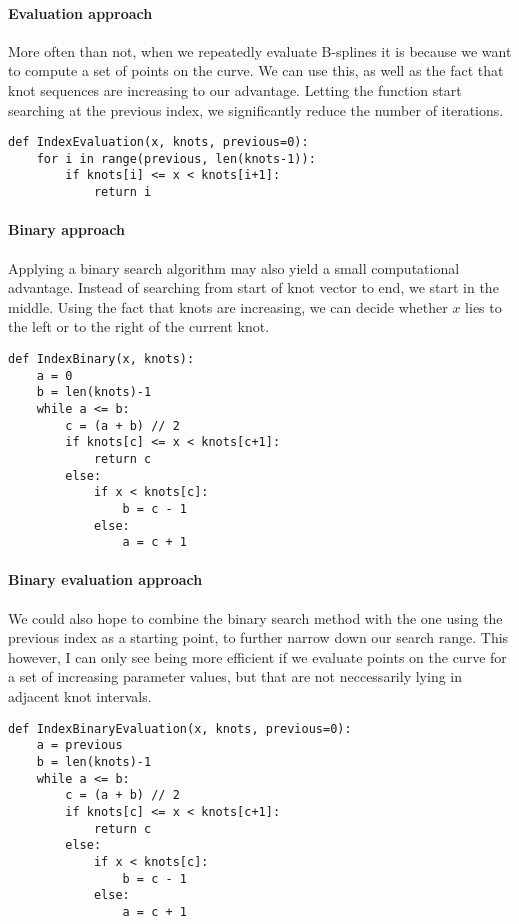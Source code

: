 \documentclass[a4paper]{article}
\begin{document}
    \paragraph{Evaluation approach}
    \label{par:evaluation_approach}
    More often than not, when we repeatedly evaluate B-splines it is because we
    want to compute a set of points on the curve. We can use this, as well as
    the fact that knot sequences are increasing to our advantage. Letting the
    function start searching at the previous index, we significantly reduce the
    number of iterations. 
    \begin{verbatim}
def IndexEvaluation(x, knots, previous=0):
    for i in range(previous, len(knots-1)):
        if knots[i] <= x < knots[i+1]:
            return i
    \end{verbatim}
     
    \paragraph{Binary approach}
    \label{par:binary_approach}
    
    Applying a binary search algorithm may also yield a small computational
    advantage. Instead of searching from start of knot vector to end, we start
    in the middle. Using the fact that knots are increasing, we can decide
    whether $x$ lies to the left or to the right of the current knot.

    \begin{verbatim}
def IndexBinary(x, knots):
    a = 0
    b = len(knots)-1
    while a <= b:
        c = (a + b) // 2
        if knots[c] <= x < knots[c+1]:
            return c
        else:
            if x < knots[c]:
                b = c - 1
            else:
                a = c + 1
    \end{verbatim}

    \paragraph{Binary evaluation approach}
    \label{par:binary_evaluation_approach}
    
    We could also hope to combine the binary search method with the one using
    the previous index as a starting point, to further narrow down our search
    range. This however, I can only see being more efficient if we evaluate
    points on the curve for a set of increasing parameter values, but that
    are not neccessarily lying in adjacent knot intervals.
    \begin{verbatim}
def IndexBinaryEvaluation(x, knots, previous=0):
    a = previous
    b = len(knots)-1
    while a <= b:
        c = (a + b) // 2
        if knots[c] <= x < knots[c+1]:
            return c
        else:
            if x < knots[c]:
                b = c - 1
            else:
                a = c + 1
    \end{verbatim}
    
\end{document}
